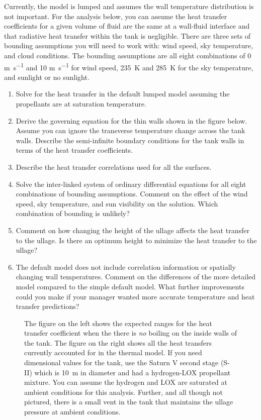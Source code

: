 \documentclass[12pt,letterpaper]{article}
\begin{document}
Currently, the model is lumped and assumes the wall temperature distribution is not important.
For the analysis below, you can assume the heat transfer coefficients for a given volume of fluid are the same at a wall-fluid interface and that radiative heat transfer within the tank is negligible.
There are three sets of bounding assumptions you will need to work with: wind speed, sky temperature, and cloud conditions.
The bounding assumptions are all eight combinations of 0 \si{\meter\per\second} and 10 \si{\meter\per\second} for wind speed, \SI{235}{\kelvin} and \SI{285}{\kelvin} for the sky temperature, and sunlight or no sunlight.

\begin{enumerate}
    \item Solve for the heat transfer in the default lumped model assuming the propellants are at saturation temperature.
    
    \item Derive the governing equation for the thin walls shown in the figure below.
        Assume you can ignore the transverse temperature change across the tank walls.
        Describe the semi-infinite boundary conditions for the tank walls in terms of the heat transfer coefficients.

    \item Describe the heat transfer correlations used for all the surfaces.

    \item Solve the inter-linked system of ordinary differential equations for all eight combinations of bounding assumptions.
        Comment on the effect of the wind speed, sky temperature, and sun visibility on the solution.
        Which combination of bounding is unlikely?

    \item Comment on how changing the height of the ullage affects the heat transfer to the ullage.
        Is there an optimum height to minimize the heat transfer to the ullage?

    \item The default model does not include correlation information or spatially changing wall temperatures.
        Comment on the differences of the more detailed model compared to the simple default model.
        What further improvements could you make if your manager wanted more accurate temperature and heat transfer predictions?
\end{enumerate}

\begin{figure}[!htpb]
	\centering
	
	\caption{The figure on the left shows the expected ranges for the heat transfer coefficient when the there is \textit{no} boiling on the inside walls of the tank.
		The figure on the right shows all the heat transfers currently accounted for in the thermal model.
		If you need dimensional values for the tank, use the Saturn V second stage (S-II) which is \SI{10}{\meter} in diameter and had a hydrogen-LOX propellant mixture.
		You can assume the hydrogen and LOX are saturated at ambient conditions for this analysis.
		Further, and all though not pictured, there is a small vent in the tank that maintains the ullage pressure at ambient conditions.}
\end{figure}
\end{document}
